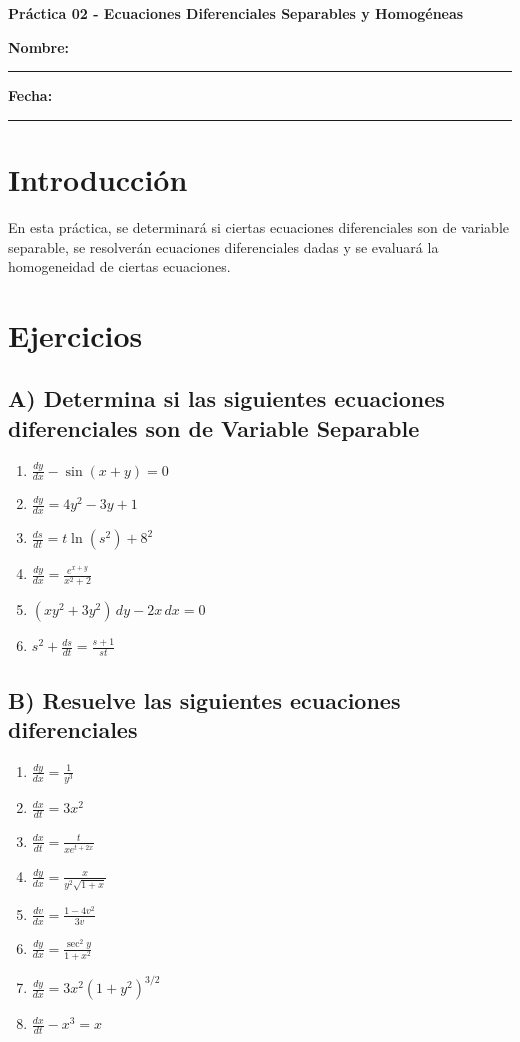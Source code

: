 \documentclass[a4paper,12pt]{article}
\begin{document}
\begin{center}
    \Large\textbf{Práctica 02 - Ecuaciones Diferenciales Separables y Homogéneas}\\[1cm]  

\end{center}
  \textbf{Nombre:} \rule{9cm}{0.4pt}  \textbf{Fecha:} \rule{4.5cm}{0.4pt}
\section*{Introducción}
\large
En esta práctica, se determinará si ciertas ecuaciones diferenciales son de variable separable, se resolverán ecuaciones diferenciales dadas y se evaluará la homogeneidad de ciertas ecuaciones.

\section*{Ejercicios}
\large

\subsection*{A) Determina si las siguientes ecuaciones diferenciales son de Variable Separable}
\begin{enumerate}
    \item $\frac{dy}{dx} - \sin(x + y) = 0$
    \item $\frac{dy}{dx} = 4y^2 - 3y + 1$
    \item $\frac{ds}{dt} = t \ln(s^2) + 8^2$
    \item $\frac{dy}{dx} = \frac{e^{x + y}}{x^2 + 2}$
    \item $(xy^2 + 3y^2) \, dy - 2x \, dx = 0$
    \item $s^2 + \frac{ds}{dt} = \frac{s + 1}{st}$
\end{enumerate}

\subsection*{B) Resuelve las siguientes ecuaciones diferenciales}
\begin{enumerate}
    \item $\frac{dy}{dx} = \frac{1}{y^3}$
    \item $\frac{dx}{dt} = 3x^2$
    \item $\frac{dx}{dt} = \frac{t}{x e^{t + 2x}}$
    \item $\frac{dy}{dx} = \frac{x}{y^2 \sqrt{1 + x}}$
    \item $\frac{dv}{dx} = \frac{1 - 4v^2}{3v}$
    \item $\frac{dy}{dx} = \frac{\sec^2 y}{1 + x^2}$
    \item $\frac{dy}{dx} = 3x^2(1 + y^2)^{3/2}$
    \item $\frac{dx}{dt} - x^3 = x$
\end{enumerate}
\end{document}
